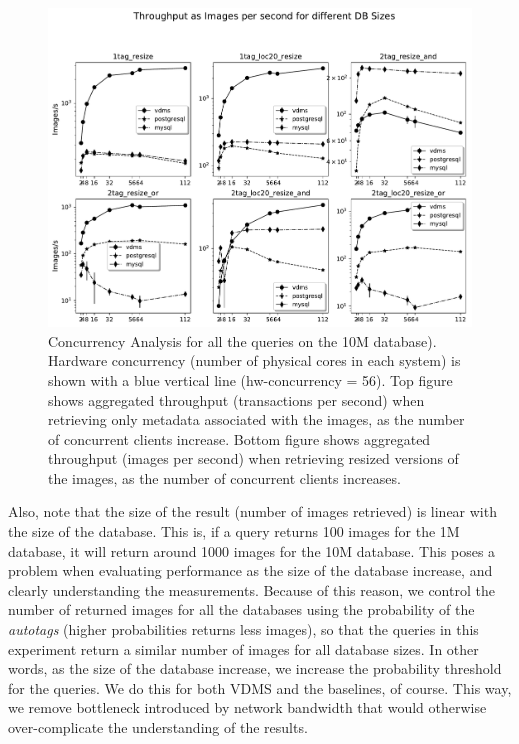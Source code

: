 \begin{figure}[ht]
\includegraphics[width=\textwidth]{figures/plot_conc_10M_mosaic_results_throughput}
\caption{Concurrency Analysis for all the queries on the 10M database).
Hardware concurrency (number of physical cores in each system)
is shown with a blue vertical line (hw-concurrency = 56).
Top figure shows aggregated throughput (transactions per second)
when retrieving only metadata associated with the images, as the number of
concurrent clients increase.
Bottom figure shows aggregated throughput (images per second) when retrieving
resized versions of the images, as the number of concurrent clients increases.}
\label{fig:concurrency_comparison_10M}
\end{figure}

Also, note that the size of the result (number of images retrieved)
is linear with the size of the database. This is, if a query returns 100 images
for the 1M database, it will return around 1000 images for the 10M database.
This poses a problem when evaluating performance as the size of the database increase,
and clearly understanding the measurements.
Because of this reason, we control the number of returned images for all the
databases using the probability of the \textit{autotags}
(higher probabilities returns less images), so that the queries in
this experiment return a similar number of images for all database sizes.
In other words, as the size of the database increase, we increase the probability
threshold for the queries. We do this for both VDMS and the baselines, of course.
This way, we remove bottleneck introduced by network bandwidth that would
otherwise over-complicate the understanding of the results.

